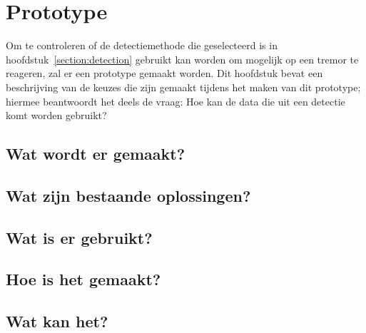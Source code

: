\section{Prototype}
\label{section:prototyping}

Om te controleren of de detectiemethode die geselecteerd is in hoofdstuk~\ref{section:detection}
gebruikt kan worden om mogelijk op een tremor te reageren,
zal er een prototype gemaakt worden.
Dit hoofdstuk bevat een beschrijving van de keuzes die zijn gemaakt tijdens het maken van dit prototype;
hiermee beantwoordt het deels de vraag: Hoe kan de data die uit een detectie komt worden gebruikt?

\subsection{Wat wordt er gemaakt?}

\subsection{Wat zijn bestaande oplossingen?}

\subsection{Wat is er gebruikt?}

\subsection{Hoe is het gemaakt?}

\subsection{Wat kan het?}